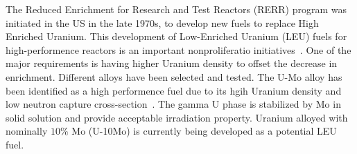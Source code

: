 \begin{doublespacing}

 The Reduced Enrichment for Research and Test Reactors (RERR) program was initiated in the US in the late 1970s, to develop new fuels to replace High Enriched Uranium. This development of Low-Enriched Uranium (LEU) fuels for high-performence reactors is an important nonproliferatio initiatives~\cite{snelgrove1997development}. One of the major requirements is having higher Uranium density to offset the decrease in enrichment. Different alloys have been selected and tested. The U-Mo alloy has been identified as a high performence fuel due to its hgih Uranium density and low neutron capture cross-section~\cite{ewh2010microstructural,smirnova2013ternary,rest2009analysis,landa2013density}. The gamma U phase is stabilized by Mo in solid solution and provide acceptable irradiation property. Uranium alloyed with nominally $10\%$ Mo (U-10Mo) is currently being developed as a potential LEU fuel. 



\end{doublespacing}
